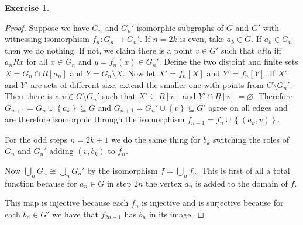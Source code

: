 \documentclass{article}
\newcommand{\set}[1]{\left\{#1\right\}}
\theoremstyle{definition}
\newtheorem{question}{Exercise}
\begin{document}
\begin{question}
\begin{enumerate}[(a)]
\begin{proof}
                  Suppose we have \(G_{n}\) and \(G_{n}'\) isomorphic subgraphs
                  of \(G\) and \(G'\) with witnessing isomorphism
                  \(f_{n}:G_{n}\to G_{n}'\). If \(n=2k\) is even, take
                  \(a_{k}\in G\). If \(a_{k}\in G_{n}\) then we do nothing. If
                  not, we claim there is a point \(v\in G'\) such that \(vRy\)
                  iff \(a_{n}Rx\) for all \(x\in G_{n}\) and \(y=f_{n}(x)\in
                  G_{n}'\). Define the two disjoint and finite sets
                  \(X=G_{n}\cap R[a_{n}]\) and \(Y=G_{n}\setminus X\). Now let
                  \(X'=f_{n}[X]\) and \(Y'=f_{n}[Y]\). If \(X'\) and \(Y'\) are
                  sets of different size, extend the smaller one with points
                  from \(G\setminus G_{n}'\). Then there is a \(v\in G\setminus
                  G_{n}'\) such that \(X'\subseteq R[v]\) and \(Y'\cap
                  R[v]=\varnothing\). Therefore
                  \(G_{n+1}=G_{n}\cup\set{a_{k}}\subseteq G\) and
                  \(G_{n+1}=G_{n}'\cup\set{v}\subseteq G'\) agree on all edges
                  and are therefore isomorphic through the isomorphism
                  \(f_{n+1}=f_{n}\cup\set{(a_{k},v)}\).

                  For the odd steps \(n=2k+1\) we do the same thing for
                  \(b_{k}\) switching the roles of \(G_{n}\) and \(G_{n}'\)
                  adding \((v,b_{k})\) to \(f_{n}\).

                  Now \(\bigcup_{n}G_{n}\cong\bigcup_{n}G_{n}'\) by the
                  isomorphism \(f=\bigcup_{n}f_{n}\). This is first of all a
                  total function because for \(a_{n}\in G\) in step \(2n\) the
                  vertex \(a_{n}\) is added to the domain of \(f\).

                  This map is injective because each \(f_{n}\) is injective and
                  is surjective because for each \(b_{n}\in G'\) we have that
                  \(f_{2n+1}\) has \(b_{n}\) in its image.
              \end{proof}
    \end{enumerate}
\end{question}
\end{document}

